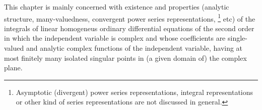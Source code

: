 



\label{chap:fuchs}



This chapter is mainly concerned with existence and properties (analytic structure, many-valuedness,
convergent power series representations,%
\footnote{Asymptotic (divergent) power series
   representations, integral representations or other kind of series
   representations are not discussed in general.}
etc) of the integrals of linear homogeneus ordinary differential equations of the
second order in which the independent variable is complex and whose coefficients
are single-valued and analytic complex functions of the independent variable, having
at most finitely many isolated singular points in (a given domain of) the
complex plane.







